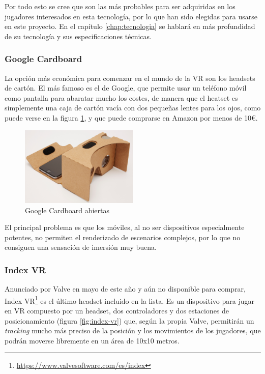 Por todo esto se cree que son las más probables para ser adquiridas en los jugadores interesados en esta tecnología, por lo que han sido elegidas para usarse en este proyecto. En el capítulo \ref{chap:tecnologia} se hablará en más profundidad de su tecnología y sus especificaciones técnicas.

\subsubsection{Google Cardboard} 

La opción más económica para comenzar en el mundo de la \acs{VR} son los headsets de cartón. El más famoso es el de Google, que permite usar un teléfono móvil como pantalla para abaratar mucho los costes, de manera que el heatset es simplemente una caja de cartón vacía con dos pequeñas lentes para los ojos, como puede verse en la figura \ref{fig:google-cardboard}, y que puede comprarse en Amazon por menos de 10\euro.
    
\begin{figure}[!h]
\begin{center}
\includegraphics[width=0.5\textwidth]{imagenes/2/cardboard.jpg}
\caption{Google Cardboard abiertas}
\label{fig:google-cardboard}
\end{center}
\end{figure}

El principal problema es que los móviles, al no ser dispositivos especialmente potentes, no permiten el renderizado de escenarios complejos, por lo que no consiguen una sensación de imersión muy buena.

\subsubsection{Index VR}

Anunciado por Valve en mayo de este año y aún no disponible para comprar, Index VR\footnote{\url{https://www.valvesoftware.com/es/index}} es el último headset incluido en la lista. Es un dispositivo para jugar en \acs{VR} compuesto por un headset, dos controladores y dos estaciones de posicionamiento (figura \ref{fig:index-vr}) que, según la propia Valve, permitirán un \textit{tracking} mucho más preciso de la posición y los movimientos de los jugadores, que podrán moverse libremente en un área de 10x10 metros.

